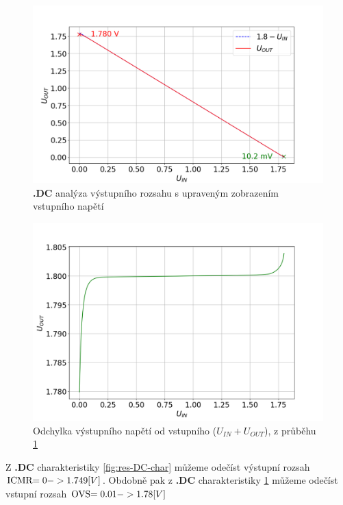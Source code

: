 \begin{figure}[h!]
    \centering
    \includegraphics[width=\textwidth]{text/img/DC2-charakteristika.png}
    \caption{\label{fig:res-DC2-char} {\bf .DC} analýza výstupního rozsahu s upraveným zobrazením vstupního napětí}
\end{figure}

\begin{figure}[h!]
    \centering
    \includegraphics[width=\textwidth]{text/img/DC2-korekcni.png}
    \caption{\label{fig:res-DC2-korekcni} Odchylka výstupního napětí od vstupního (\(U_{IN} + U_{OUT}\)), z průběhu \ref{fig:res-DC2-char}}
\end{figure}

Z {\bf .DC} charakteristiky \ref{fig:res-DC-char} můžeme odečíst výstupní rozsah \($ICMR$ = 0 -> 1.749 [V]\).
Obdobně pak z {\bf .DC} charakteristiky \ref{fig:res-DC2-char} můžeme odečíst vstupní rozsah \($OVS$ = 0.01 -> 1.78 [V]\)